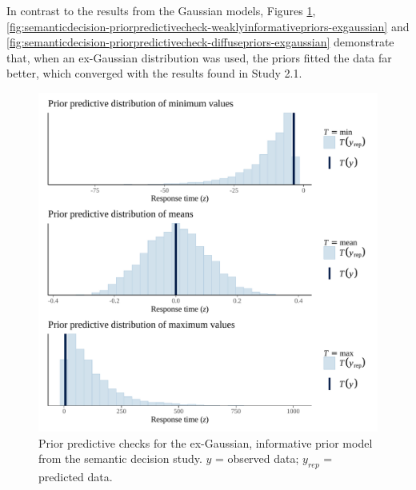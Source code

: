 \documentclass[
  12pt,
  man,floatsintext]{apa7}
\begin{document}
In contrast to the results from the Gaussian models, Figures \ref{fig:semanticdecision-priorpredictivecheck-informativepriors-exgaussian}, \ref{fig:semanticdecision-priorpredictivecheck-weaklyinformativepriors-exgaussian} and \ref{fig:semanticdecision-priorpredictivecheck-diffusepriors-exgaussian} demonstrate that, when an ex-Gaussian distribution was used, the priors fitted the data far better, which converged with the results found in Study 2.1.



\begin{figure}

{\centering \includegraphics[width=0.8\linewidth]{../semanticdecision/bayesian_analysis/prior_predictive_checks/plots/semanticdecision_priorpredictivecheck_informativepriors_exgaussian} 

}

\caption{Prior predictive checks for the ex-Gaussian, informative prior model from the semantic decision study. \(y\) = observed data; \(y_{rep}\) = predicted data.}\label{fig:semanticdecision-priorpredictivecheck-informativepriors-exgaussian}
\end{figure}
\end{document}

